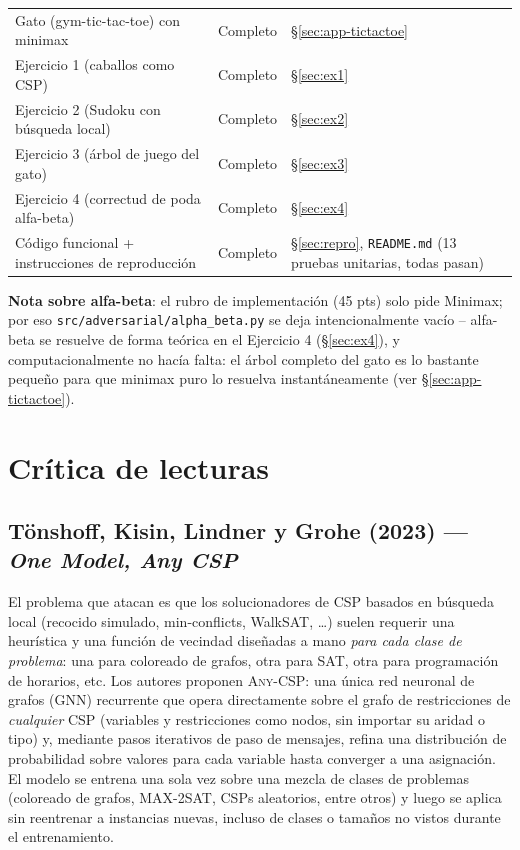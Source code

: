 \documentclass[11pt,onecolumn,letterpaper]{article}
\newcommand{\code}[1]{\texttt{#1}}
\begin{document}
\begin{center}
\begin{tabular}{@{}p{7.7cm}p{2.1cm}p{5.6cm}@{}}
Gato (gym-tic-tac-toe) con minimax & Completo & \S\ref{sec:app-tictactoe} \\
Ejercicio 1 (caballos como CSP) & Completo & \S\ref{sec:ex1} \\
Ejercicio 2 (Sudoku con b\'usqueda local) & Completo & \S\ref{sec:ex2} \\
Ejercicio 3 (\'arbol de juego del gato) & Completo & \S\ref{sec:ex3} \\
Ejercicio 4 (correctud de poda alfa-beta) & Completo & \S\ref{sec:ex4} \\
C\'odigo funcional + instrucciones de reproducci\'on & Completo & \S\ref{sec:repro}, \code{README.md} (13 pruebas unitarias, todas pasan) \\
\bottomrule
\end{tabular}
\end{center}

\noindent\textbf{Nota sobre alfa-beta}: el rubro de implementaci\'on (45 pts) solo pide
Minimax; por eso \code{src/adversarial/alpha\_beta.py} se deja intencionalmente vac\'io
-- alfa-beta se resuelve de forma te\'orica en el Ejercicio 4 (\S\ref{sec:ex4}), y
computacionalmente no hac\'ia falta: el \'arbol completo del gato es lo bastante peque\~no
para que minimax puro lo resuelva instant\'aneamente (ver \S\ref{sec:app-tictactoe}).

\section{Cr\'itica de lecturas}

\subsection{T\"onshoff, Kisin, Lindner y Grohe (2023) --- \emph{One Model, Any CSP}~\cite{tonshoff2023onemodel}}
\label{sec:readings-tonshoff}

El problema que atacan es que los solucionadores de CSP basados en b\'usqueda local
(recocido simulado, min-conflicts, WalkSAT, \dots) suelen requerir una heur\'istica y una
funci\'on de vecindad dise\~nadas a mano \emph{para cada clase de problema}: una para
coloreado de grafos, otra para SAT, otra para programaci\'on de horarios, etc. Los autores
proponen \textsc{Any-CSP}: una \'unica red neuronal de grafos (GNN) recurrente que opera
directamente sobre el grafo de restricciones de \emph{cualquier} CSP (variables y
restricciones como nodos, sin importar su aridad o tipo) y, mediante pasos iterativos de
paso de mensajes, refina una distribuci\'on de probabilidad sobre valores para cada
variable hasta converger a una asignaci\'on. El modelo se entrena una sola vez sobre una
mezcla de clases de problemas (coloreado de grafos, MAX-2SAT, CSPs aleatorios, entre
otros) y luego se aplica sin reentrenar a instancias nuevas, incluso de clases o tama\~nos
no vistos durante el entrenamiento.
\end{document}
